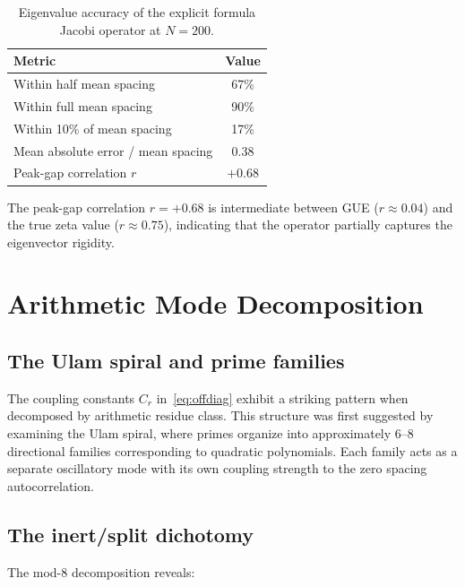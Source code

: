 \documentclass[11pt,a4paper]{article}
\begin{document}
\begin{table}[ht]
\centering
\begin{tabular}{@{}lc@{}}
\toprule
Metric & Value \\
\midrule
Within half mean spacing & 67\% \\
Within full mean spacing & 90\% \\
Within 10\% of mean spacing & 17\% \\
Mean absolute error / mean spacing & 0.38 \\
Peak-gap correlation $r$ & $+0.68$ \\
\bottomrule
\end{tabular}
\caption{Eigenvalue accuracy of the explicit formula Jacobi operator at $N = 200$.}
\label{tab:performance}
\end{table}

The peak-gap correlation $r = +0.68$ is intermediate between GUE ($r \approx 0.04$) and the true zeta value ($r \approx 0.75$), indicating that the operator partially captures the eigenvector rigidity.

\section{Arithmetic Mode Decomposition}\label{sec:modes}

\subsection{The Ulam spiral and prime families}

The coupling constants $C_r$ in~\eqref{eq:offdiag} exhibit a striking pattern when decomposed by arithmetic residue class.
This structure was first suggested by examining the Ulam spiral, where primes organize into approximately 6--8 directional families corresponding to quadratic polynomials.
Each family acts as a separate oscillatory mode with its own coupling strength to the zero spacing autocorrelation.

\subsection{The inert/split dichotomy}

The mod-8 decomposition reveals:
\end{document}
